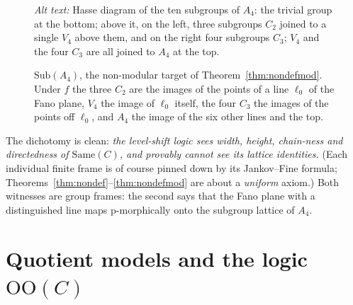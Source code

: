 \documentclass[11pt]{amsart}
\theoremstyle{definition}
\newcommand{\Same}{\mathrm{Same}}
\newcommand{\Sub}{\mathrm{Sub}}
\begin{document}
\begin{figure}[ht]
\centering
{}
\caption{$\Sub(A_4)$, the non-modular target of Theorem~\ref{thm:nondefmod}.
Under $f$ the three $C_2$ are the images of the points of a line $\ell_0$ of
the Fano plane, $V_4$ the image of $\ell_0$ itself, the four $C_3$ the images
of the points off $\ell_0$, and $A_4$ the image of the six other lines and the
top.}
\label{fig:a4}
\par\smallskip\noindent\textit{Alt text:} Hasse diagram of the ten subgroups of $A_4$: the trivial group at the
bottom; above it, on the left, three subgroups $C_2$ joined to a single $V_4$
above them, and on the right four subgroups $C_3$; $V_4$ and the four $C_3$
are all joined to $A_4$ at the top.
\end{figure}

The dichotomy is clean: \emph{the level-shift logic sees width, height,
chain-ness and directedness of $\Same(C)$, and provably cannot see its lattice
identities.} (Each individual finite frame is of course pinned down by its
Jankov--Fine formula; Theorems~\ref{thm:nondef}--\ref{thm:nondefmod} are about
a \emph{uniform} axiom.) Both witnesses are group frames: the second says that
the Fano plane with a distinguished line maps p-morphically onto the subgroup
lattice of $A_4$.

\section{Quotient models and the logic $\mathrm{OO}(C)$}\label{sec:models}
\end{document}
